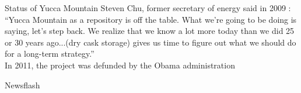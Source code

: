 \documentclass[10pt]{beamer}
\begin{document}
\begin{frame}{Status of Yucca Mountain}
Steven Chu, former secretary of energy said in 2009 \cite{aa12}:\\
\vspace{0.5cm}
``Yucca Mountain as a repository is off the table. What we’re going to be doing is saying, let’s step back. We realize that we know a lot more today than we did 25 or 30 years ago...(dry cask storage) gives us time to figure out what we should do for a long-term strategy.''\\
\vspace{0.5cm}
In 2011, the project was defunded by the Obama administration
\end{frame}

\begin{frame}{Newsflash}
\end{frame}
\end{document}
